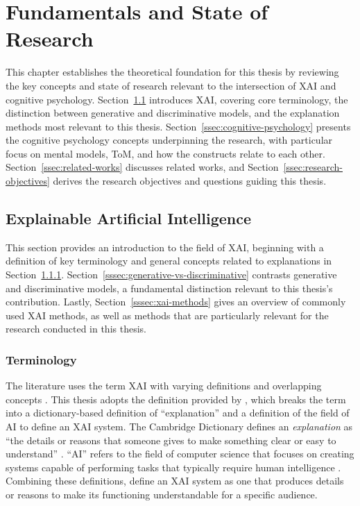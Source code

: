 \section{Fundamentals and State of Research} \label{sec:fundamentals}

This chapter establishes the theoretical foundation for this thesis by reviewing the key concepts and state of research relevant to the intersection of \ac{XAI} and cognitive psychology. Section~\ref{ssec:xai} introduces \ac{XAI}, covering core terminology, the distinction between generative and discriminative models, and the explanation methods most relevant to this thesis. Section~\ref{ssec:cognitive-psychology} presents the cognitive psychology concepts underpinning the research, with particular focus on mental models, \ac{ToM}, and how the constructs relate to each other. Section~\ref{ssec:related-works} discusses related works, and Section~\ref{ssec:research-objectives} derives the research objectives and questions guiding this thesis.

\subsection{Explainable Artificial Intelligence} \label{ssec:xai}

This section provides an introduction to the field of \ac{XAI}, beginning with a definition of key terminology and general concepts related to explanations in Section~\ref{sssec:terminology}. Section~\ref{sssec:generative-vs-discriminative} contrasts generative and discriminative models, a fundamental distinction relevant to this thesis's contribution. Lastly, Section~\ref{sssec:xai-methods} gives an overview of commonly used \ac{XAI} methods, as well as methods that are particularly relevant for the research conducted in this thesis.

\subsubsection{Terminology} \label{sssec:terminology}

The literature uses the term \ac{XAI} with varying definitions and overlapping concepts \parencite{Arrieta2020}. This thesis adopts the definition provided by \textcite{Arrieta2020}, which breaks the term into a dictionary-based definition of \enquote{explanation} and a definition of the field of \ac{AI} to define an \ac{XAI} system. The Cambridge Dictionary defines an \textit{explanation} as \enquote{the details or reasons that someone gives to make something clear or easy to understand} \parencite{CambridgeDictionaryExplanation}. \enquote{\acl{AI}} refers to the field of computer science that focuses on creating systems capable of performing tasks that typically require human intelligence \parencite{Russell2020}. Combining these definitions, \textcite{Arrieta2020} define an \ac{XAI} system as one that produces details or reasons to make its functioning understandable for a specific audience.

